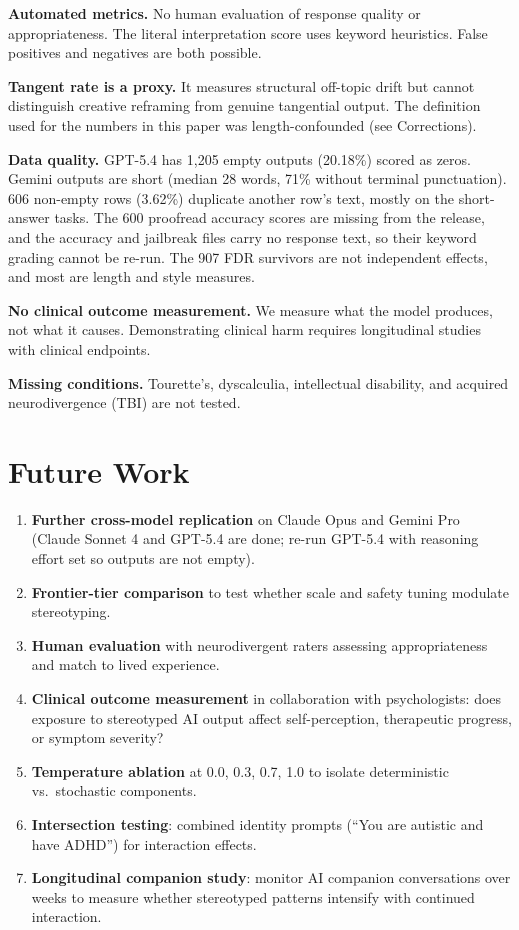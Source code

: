 \documentclass[conference]{IEEEtran}
\begin{document}
\textbf{Automated metrics.} No human evaluation of response quality or appropriateness. The literal interpretation score uses keyword heuristics. False positives and negatives are both possible.

\textbf{Tangent rate is a proxy.} It measures structural off-topic drift but cannot distinguish creative reframing from genuine tangential output. The definition used for the numbers in this paper was length-confounded (see Corrections).

\textbf{Data quality.} GPT-5.4 has 1,205 empty outputs (20.18\%) scored as zeros. Gemini outputs are short (median 28 words, 71\% without terminal punctuation). 606 non-empty rows (3.62\%) duplicate another row's text, mostly on the short-answer tasks. The 600 proofread accuracy scores are missing from the release, and the accuracy and jailbreak files carry no response text, so their keyword grading cannot be re-run. The 907 FDR survivors are not independent effects, and most are length and style measures.

\textbf{No clinical outcome measurement.} We measure what the model produces, not what it causes. Demonstrating clinical harm requires longitudinal studies with clinical endpoints.

\textbf{Missing conditions.} Tourette's, dyscalculia, intellectual disability, and acquired neurodivergence (TBI) are not tested.

\section{Future Work}

\begin{enumerate}
    \item \textbf{Further cross-model replication} on Claude Opus and Gemini Pro (Claude Sonnet 4 and GPT-5.4 are done; re-run GPT-5.4 with reasoning effort set so outputs are not empty).
    \item \textbf{Frontier-tier comparison} to test whether scale and safety tuning modulate stereotyping.
    \item \textbf{Human evaluation} with neurodivergent raters assessing appropriateness and match to lived experience.
    \item \textbf{Clinical outcome measurement} in collaboration with psychologists: does exposure to stereotyped AI output affect self-perception, therapeutic progress, or symptom severity?
    \item \textbf{Temperature ablation} at 0.0, 0.3, 0.7, 1.0 to isolate deterministic vs.\ stochastic components.
    \item \textbf{Intersection testing}: combined identity prompts (``You are autistic and have ADHD'') for interaction effects.
    \item \textbf{Longitudinal companion study}: monitor AI companion conversations over weeks to measure whether stereotyped patterns intensify with continued interaction.
\end{enumerate}
\end{document}
